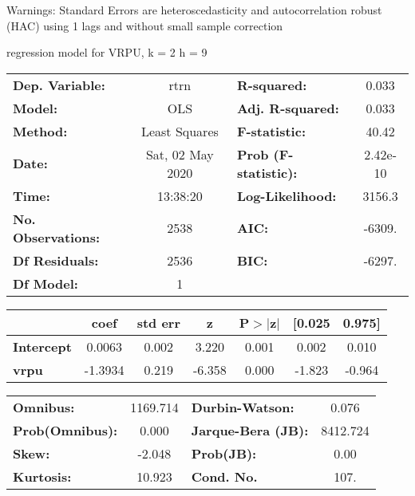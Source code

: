 Warnings: \newline
 [1] Standard Errors are heteroscedasticity and autocorrelation robust (HAC) using 1 lags and without small sample correction\ 

regression model for VRPU, k = 2 h = 9\begin{center}
\begin{tabular}{lclc}
\toprule
\textbf{Dep. Variable:}    &       rtrn       & \textbf{  R-squared:         } &     0.033   \\
\textbf{Model:}            &       OLS        & \textbf{  Adj. R-squared:    } &     0.033   \\
\textbf{Method:}           &  Least Squares   & \textbf{  F-statistic:       } &     40.42   \\
\textbf{Date:}             & Sat, 02 May 2020 & \textbf{  Prob (F-statistic):} &  2.42e-10   \\
\textbf{Time:}             &     13:38:20     & \textbf{  Log-Likelihood:    } &    3156.3   \\
\textbf{No. Observations:} &        2538      & \textbf{  AIC:               } &    -6309.   \\
\textbf{Df Residuals:}     &        2536      & \textbf{  BIC:               } &    -6297.   \\
\textbf{Df Model:}         &           1      & \textbf{                     } &             \\
\bottomrule
\end{tabular}
\begin{tabular}{lcccccc}
                   & \textbf{coef} & \textbf{std err} & \textbf{z} & \textbf{P$> |$z$|$} & \textbf{[0.025} & \textbf{0.975]}  \\
\midrule
\textbf{Intercept} &       0.0063  &        0.002     &     3.220  &         0.001        &        0.002    &        0.010     \\
\textbf{vrpu}      &      -1.3934  &        0.219     &    -6.358  &         0.000        &       -1.823    &       -0.964     \\
\bottomrule
\end{tabular}
\begin{tabular}{lclc}
\textbf{Omnibus:}       & 1169.714 & \textbf{  Durbin-Watson:     } &    0.076  \\
\textbf{Prob(Omnibus):} &   0.000  & \textbf{  Jarque-Bera (JB):  } & 8412.724  \\
\textbf{Skew:}          &  -2.048  & \textbf{  Prob(JB):          } &     0.00  \\
\textbf{Kurtosis:}      &  10.923  & \textbf{  Cond. No.          } &     107.  \\
\bottomrule
\end{tabular}
\end{center}

